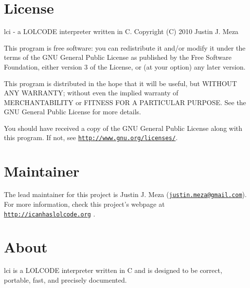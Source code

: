\hypertarget{index_license}{}\section{License}\label{index_license}
lci -\/ a L\-O\-L\-C\-O\-D\-E interpreter written in C. Copyright (C) 2010 Justin J. Meza

This program is free software\-: you can redistribute it and/or modify it under the terms of the G\-N\-U General Public License as published by the Free Software Foundation, either version 3 of the License, or (at your option) any later version.

This program is distributed in the hope that it will be useful, but W\-I\-T\-H\-O\-U\-T A\-N\-Y W\-A\-R\-R\-A\-N\-T\-Y; without even the implied warranty of M\-E\-R\-C\-H\-A\-N\-T\-A\-B\-I\-L\-I\-T\-Y or F\-I\-T\-N\-E\-S\-S F\-O\-R A P\-A\-R\-T\-I\-C\-U\-L\-A\-R P\-U\-R\-P\-O\-S\-E. See the G\-N\-U General Public License for more details.

You should have received a copy of the G\-N\-U General Public License along with this program. If not, see \href{http://www.gnu.org/licenses/}{\tt http\-://www.\-gnu.\-org/licenses/}.\hypertarget{index_maintainer}{}\section{Maintainer}\label{index_maintainer}
The lead maintainer for this project is Justin J. Meza (\href{mailto:justin.meza@gmail.com}{\tt justin.\-meza@gmail.\-com}). For more information, check this project's webpage at \href{http://icanhaslolcode.org}{\tt http\-://icanhaslolcode.\-org} .\hypertarget{index_about}{}\section{About}\label{index_about}
lci is a L\-O\-L\-C\-O\-D\-E interpreter written in C and is designed to be correct, portable, fast, and precisely documented.


